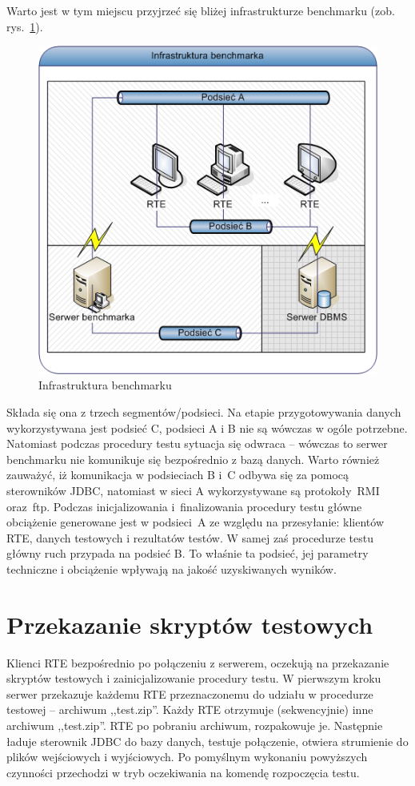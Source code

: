 Warto jest w tym miejscu przyjrzeć się bliżej infrastrukturze benchmarku (zob. rys.~\ref{rys:infrastructure2b}).
\begin{figure}[h]
\begin{center}
\includegraphics[width=0.8\linewidth]{figures/infrastructure2b.png}
\end{center}
\caption{Infrastruktura benchmarku}\label{rys:infrastructure2b}
\end{figure}
Składa się ona z trzech segmentów/podsieci. Na etapie przygotowywania danych
wykorzystywana jest podsieć C, podsieci A i B nie są wówczas w ogóle potrzebne.
Natomiast podczas procedury testu sytuacja się odwraca -- wówczas to serwer benchmarku
nie komunikuje się bezpośrednio z bazą danych. Warto również zauważyć, iż komunikacja w podsieciach B i~C
odbywa się za pomocą sterowników JDBC, natomiast w sieci A wykorzystywane są protokoły~RMI oraz~ftp.
Podczas inicjalizowania i~finalizowania procedury testu główne obciążenie generowane jest w podsieci~A
ze względu na przesyłanie: klientów RTE, danych testowych i rezultatów testów. W samej zaś procedurze testu
główny ruch przypada na podsieć B. To właśnie ta podsieć, jej parametry techniczne i obciążenie wpływają na 
jakość uzyskiwanych wyników.

\section{Przekazanie skryptów testowych}
Klienci RTE bezpośrednio po połączeniu z serwerem, oczekują na przekazanie skryptów testowych
i zainicjalizowanie procedury testu. W pierwszym kroku serwer przekazuje każdemu RTE
przeznaczonemu do udziału w procedurze testowej -- archiwum ,,test.zip''. Każdy RTE otrzymuje (sekwencyjnie)
inne archiwum ,,test.zip''. RTE po pobraniu archiwum, rozpakowuje je. Następnie ładuje sterownik 
JDBC do bazy danych, testuje połączenie, otwiera strumienie do plików wejściowych i wyjściowych. 
Po pomyślnym wykonaniu powyższych czynności przechodzi w tryb oczekiwania na komendę rozpoczęcia testu.

